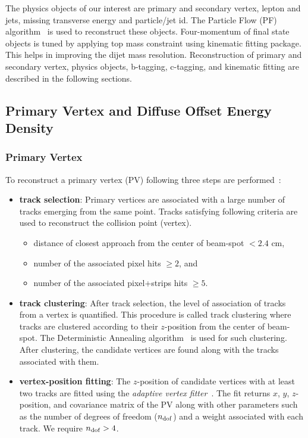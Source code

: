 The physics objects of our interest are primary and secondary vertex, lepton and jets, missing transverse energy and particle/jet id. 
The Particle Flow (PF) algorithm~\cite{CMS-PAS-PFT-09-001,CMS-PAS-PFT-10-001} is used to reconstruct these objects.
Four-momentum of final state objects is tuned by applying top mass constraint using kinematic
fitting package. This helps in improving the dijet mass resolution.
Reconstruction of primary and secondary vertex, physics objects, b-tagging, c-tagging, and kinematic fitting are described in the following sections.

\subsection{Primary Vertex and Diffuse Offset Energy Density}
\subsubsection{Primary Vertex}
\label{s:secPV}
    To reconstruct a primary vertex (PV) following three steps are performed~\cite{chatrchyan:2014fea}:
    \begin{itemize}
        \item {\bf{ track selection}}: Primary vertices are associated with a large number of tracks
            emerging from the same point. Tracks satisfying following criteria are used to reconstruct the collision point (vertex). 
           \begin{itemize}
               \item distance of closest approach from the center of beam-spot $< 2.4$ cm,
               \item number of the associated pixel hits $\geq 2$, and
               \item number of the associated pixel+strips hits $\geq 5$.
           \end{itemize}
      \item {\bf{ track clustering}}: After track selection, the level of association of tracks from a vertex is quantified.
          This procedure is called track clustering where tracks are clustered according to their $z$-position
          from the center of beam-spot. The Deterministic Annealing algorithm~\cite{an-11-014, 726788} is used for such
          clustering. After clustering, the candidate vertices are found along with the tracks associated with them.
      \item {\bf{ vertex-position fitting}}: The $z$-position of candidate vertices with at least two tracks
           are fitted using the {\em adaptive vertex fitter}~\cite{Fruhwirth:1027031}. The fit returns
           $x$, $y$, $z$-position, and covariance matrix of the PV along with other parameters such as the number
           of degrees of freedom ($n_{\rm dof}$) and a weight associated with each track. We require $n_{\rm dof} > 4$.
   \end{itemize}

